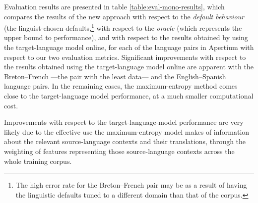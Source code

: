 \documentclass[11pt]{article}
\newcommand{\comment}[1]{\todo{#1}}
\begin{document}
 Evaluation results are presented in 
 table \ref{table:eval-mono-results}, which compares the results of
 the new approach with respect to the \emph{default behaviour} (the
 linguist-chosen defaults,\footnote{The high error rate
   for the Breton--French pair may be as a result of having the
   linguistic defaults tuned to a different domain than that of the
   corpus.}  with respect to the \emph{oracle} (which represents the
 upper bound to performance), and with respect to the results obtained
 by using the target-language model online, for each of the language
 pairs in Apertium with respect to our two evaluation metrics.
 Significant improvements with respect to the results obtained using
 the target-language model online are apparent with the Breton--French
 ---the pair with the least data--- and the English--Spanish language
 pairs. In the remaining cases, the maximum-entropy method comes close
 to the target-language model performance, at a much smaller
 computational cost.



Improvements with
 respect to the target-language-model performance are very likely due
 to the effective use the maximum-entropy model makes of information
 about the relevant source-language contexts and their translations,
 through the weighting of features representing those source-language
 contexts across the whole training corpus. 

\end{document}
